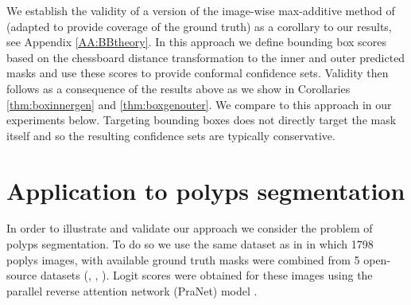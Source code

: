 We establish the validity of a version of the image-wise max-additive method of \cite{Andeol2023} (adapted to provide coverage of the ground truth) as a corollary to our results, see Appendix \ref{AA:BBtheory}. In this approach we define bounding box scores based on the chessboard distance transformation to the inner and outer predicted masks and use these scores to provide conformal confidence sets. Validity then follows as a consequence of the results above as we show in Corollaries \ref{thm:boxinnergen} and \ref{thm:boxgenouter}. We compare to this approach in our experiments below. Targeting bounding boxes does not directly target the mask itself and so the resulting confidence sets are typically conservative.

\section{Application to polyps segmentation}\label{SS:res}
In order to illustrate and validate our approach we consider the problem of polyps segmentation. To do so we use the same dataset as in \cite{Angelopoulos2022} in which 1798 poplys images, with available ground truth masks were combined from 5 open-source datasets (\cite{KVASIR2017}, \cite{Hyperkvasir2020} \cite{Bernal2012}, \cite{Silva2014}). Logit scores were obtained for these images using the parallel reverse attention network (PraNet) model \citep{PraNet2020}.


